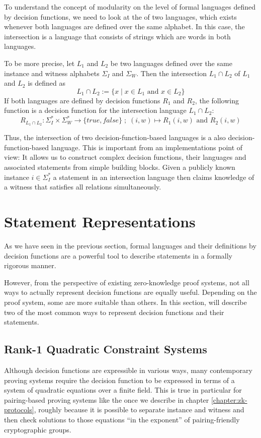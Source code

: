 To understand the concept of modularity on the level of formal languages defined by decision functions, we need to look at the  of two languages, which exists whenever both languages are defined over the same alphabet. In this case, the intersection is a language that consists of strings which are words in both languages. 

To be more precise, let $L_1$ and $L_2$ be two languages defined over the same instance and witness alphabets $\Sigma_I$ and $\Sigma_W$. Then the intersection $L_1 \cap L_2$ of $L_1$ and $L_2$ is defined as
\begin{equation}
L_1 \cap L_2 := \{x\;|\; x\in L_1 \text{ and } x\in L_2\}
\end{equation} 
If both languages are defined by decision functions $R_1$ and $R_2$, the following function is a decision function for the intersection language $L_1 \cap L_2$:
\begin{equation}
R_{L_1 \cap L_2}: \Sigma_I^* \times \Sigma_W^* \to \{true, false\}\;;\;
(i,w) \mapsto R_1(i,w) \text{ and } R_2(i,w)
\end{equation}

Thus, the intersection of two decision-function-based languages is a also decision-function-based language. This is important from an implementations point of view: It allows us to construct complex decision functions, their languages and associated statements from simple building blocks. Given a publicly known instance $i\in \Sigma_I^*$ a statement in an intersection language then claims knowledge of a witness that satisfies all relations simultaneously. 

\section{Statement Representations}\label{sec:statement-representations}
As we have seen in the previous section, formal languages and their definitions by decision functions are a powerful tool to describe statements in a formally rigorous manner. 

However, from the perspective of existing zero-knowledge proof systems, not all ways to actually represent decision functions are equally useful. Depending on the proof system, some are more suitable than others. In this section, will describe two of the most common ways to represent decision functions and their statements.
\subsection{Rank-1 Quadratic Constraint Systems}
\label{sec:R1CS}
Although decision functions are expressible in various ways, many contemporary proving systems require the decision function to be expressed in terms of a system of quadratic equations over a finite field. This is true in particular for pairing-based proving systems like the once we describe in chapter \ref{chapter:zk-protocols}, roughly because it is possible to separate instance and witness and then check solutions to those equations ``in the exponent'' of pairing-friendly cryptographic groups.

